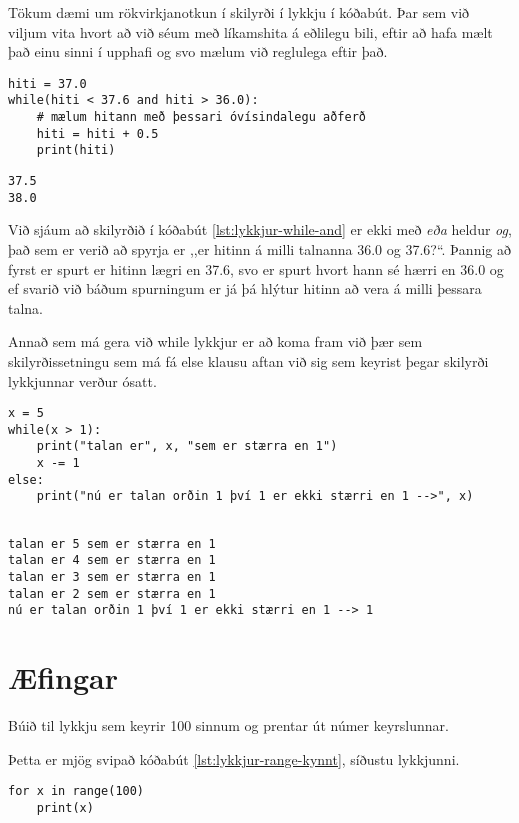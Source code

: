 Tökum dæmi um rökvirkjanotkun í skilyrði í lykkju í kóðabút.
Þar sem við viljum vita hvort að við séum með líkamshita á eðlilegu bili, eftir að hafa mælt það einu sinni í upphafi og svo mælum við reglulega eftir það.

\begin{lstlisting}[caption=while lykkja með og rökvirkjanum, label=lst:lykkjur-while-and]
hiti = 37.0
while(hiti < 37.6 and hiti > 36.0):
	# mælum hitann með þessari óvísindalegu aðferð
	hiti = hiti + 0.5
	print(hiti)
\end{lstlisting}
\lstset{style=uttak}
\begin{lstlisting}
37.5
38.0
\end{lstlisting}
\lstset{style=venjulegt}

Við sjáum að skilyrðið í kóðabút \ref{lst:lykkjur-while-and} er ekki með \emph{eða} heldur \emph{og}, það sem er verið að spyrja er ,,er hitinn á milli talnanna 36.0 og 37.6?“.
Þannig að fyrst er spurt er hitinn lægri en 37.6, svo er spurt hvort hann sé hærri en 36.0 og ef svarið við báðum spurningum er já þá hlýtur hitinn að vera á milli þessara talna. 

Annað sem má gera við while lykkjur er að koma fram við þær sem skilyrðissetningu sem má fá else klausu aftan við sig sem keyrist þegar skilyrði lykkjunnar verður ósatt.

\begin{lstlisting}[caption=Að nota else með while, label=lst:lykkjur-while-else]
x = 5
while(x > 1):
	print("talan er", x, "sem er stærra en 1")
	x -= 1 
else:
	print("nú er talan orðin 1 því 1 er ekki stærri en 1 -->", x)
	
\end{lstlisting}
\lstset{style=uttak}
\begin{lstlisting}
talan er 5 sem er stærra en 1
talan er 4 sem er stærra en 1
talan er 3 sem er stærra en 1
talan er 2 sem er stærra en 1
nú er talan orðin 1 því 1 er ekki stærri en 1 --> 1
\end{lstlisting}
\lstset{style=venjulegt}



\newpage
\section{Æfingar}
\begin{exercise}\label{lyk1}
	Búið til lykkju sem keyrir 100 sinnum og prentar út númer keyrslunnar.
\end{exercise}
\begin{Answer}[ref={lyk1}]
Þetta er mjög svipað kóðabút \ref{lst:lykkjur-range-kynnt}, síðustu lykkjunni.
\begin{lstlisting}
for x in range(100)
	print(x)\end{lstlisting}
\end{Answer}

